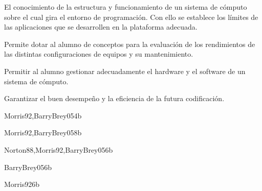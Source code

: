 \begin{syllabus}


\begin{justification}
El conocimiento de la estructura y funcionamiento de un sistema de cómputo sobre el cual gira el entorno de programación. Con ello se establece los límites de las aplicaciones que se desarrollen en la plataforma adecuada.

Permite dotar al alumno de conceptos para la evaluación de los rendimientos de las distintas configuraciones de equipos y su mantenimiento.
\end{justification}

\begin{goals}
\item Permitir al alumno gestionar adecuadamente el hardware y el software de un sistema de cómputo.
\item Garantizar el buen desempeño y la eficiencia de la futura codificación.
\end{goals}

\begin{outcomes}
\end{outcomes}

\begin{unit}{\ARDigitalLogicAndDataRepresentationDef}{Morris92,BarryBrey05}{4}{b}
   \ARDigitalLogicAndDataRepresentationAllTopics
   \ARDigitalLogicAndDataRepresentationAllObjectives
\end{unit}

\begin{unit}{\ARComputerArchitectureOrganizationDef}{Morris92,BarryBrey05}{8}{b}
   \ARComputerArchitectureOrganizationAllTopics
    \ARComputerArchitectureOrganizationAllObjectives
\end{unit}

\begin{unit}{\ARMemoryArchitectureDef}{Norton88,Morris92,BarryBrey05}{6}{b}
    \ARMemoryArchitectureAllTopics
    \ARMemoryArchitectureAllObjectives
\end{unit}

\begin{unit}{\ARInterfacingAndIOStrategiesDef}{BarryBrey05}{6}{b}
    \ARInterfacingAndIOStrategiesAllTopics
    \ARInterfacingAndIOStrategiesAllObjectives
\end{unit}

\begin{unit}{\ARFunctionalOrganizationDef}{Morris92}{6}{b}
    \ARFunctionalOrganizationAllTopics
    \ARFunctionalOrganizationAllObjectives
\end{unit}


\end{syllabus}
